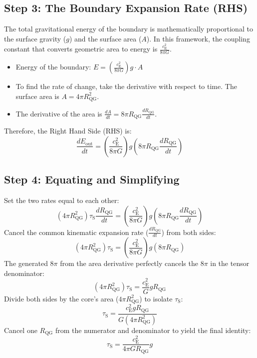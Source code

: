 \subsection*{Step 3: The Boundary Expansion Rate (RHS)}
The total gravitational energy of the boundary is mathematically proportional to the surface gravity ($g$) and the surface area ($A$). In this framework, the coupling constant that converts geometric area to energy is $\frac{c_{\mathrm{E}}^2}{8\pi G}$.
\begin{itemize}
    \item Energy of the boundary: $E = \left(\frac{c_{\mathrm{E}}^2}{8\pi G}\right) g \cdot A$
    \item To find the rate of change, take the derivative with respect to time. The surface area is $A = 4\pi R_{\mathrm{QG}}^2$.
    \item The derivative of the area is $\frac{dA}{dt} = 8\pi R_{\mathrm{QG}} \frac{dR_{\mathrm{QG}}}{dt}$.
\end{itemize}
Therefore, the Right Hand Side (RHS) is:
\begin{equation}
    \frac{dE_{\mathrm{out}}}{dt} = \left(\frac{c_{\mathrm{E}}^2}{8\pi G}\right) g \left(8\pi R_{\mathrm{QG}} \frac{dR_{\mathrm{QG}}}{dt}\right)
\end{equation}

\subsection*{Step 4: Equating and Simplifying}
Set the two rates equal to each other:
\begin{equation}
    (4\pi R_{\mathrm{QG}}^2) \tau_{\mathrm{S}} \frac{dR_{\mathrm{QG}}}{dt} = \left(\frac{c_{\mathrm{E}}^2}{8\pi G}\right) g \left(8\pi R_{\mathrm{QG}} \frac{dR_{\mathrm{QG}}}{dt}\right)
\end{equation}
Cancel the common kinematic expansion rate ($\frac{dR_{\mathrm{QG}}}{dt}$) from both sides:
\begin{equation}
    (4\pi R_{\mathrm{QG}}^2) \tau_{\mathrm{S}} = \left(\frac{c_{\mathrm{E}}^2}{8\pi G}\right) g (8\pi R_{\mathrm{QG}})
\end{equation}
The generated $8\pi$ from the area derivative perfectly cancels the $8\pi$ in the tensor denominator:
\begin{equation}
    (4\pi R_{\mathrm{QG}}^2) \tau_{\mathrm{S}} = \frac{c_{\mathrm{E}}^2}{G} g R_{\mathrm{QG}}
\end{equation}
Divide both sides by the core's area ($4\pi R_{\mathrm{QG}}^2$) to isolate $\tau_{\mathrm{S}}$:
\begin{equation}
    \tau_{\mathrm{S}} = \frac{c_{\mathrm{E}}^2 g R_{\mathrm{QG}}}{G(4\pi R_{\mathrm{QG}}^2)}
\end{equation}
Cancel one $R_{\mathrm{QG}}$ from the numerator and denominator to yield the final identity:
\begin{equation}
    \tau_{\mathrm{S}} = \frac{c_{\mathrm{E}}^2}{4\pi G R_{\mathrm{QG}}} g
\end{equation}


